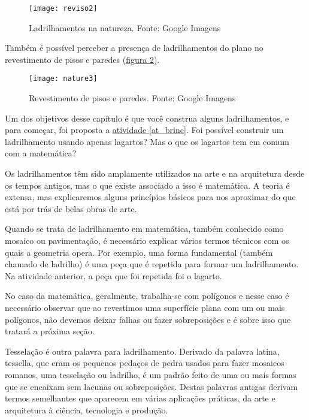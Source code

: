 \begin{figure}[H]
\centering
\texttt{[image: reviso2]}
\caption{Ladrilhamentos na natureza. Fonte: Google Imagens}
\label{natureza}
\end{figure}

Também é possível perceber a presença de ladrilhamentos do plano no revestimento de pisos e paredes (\hyperref[natureza1]{figura \ref{natureza1}}). 


\begin{figure}[H]
\centering
\texttt{[image: nature3]}
\caption{Revestimento de pisos e paredes. Fonte: Google Imagens}
\label{natureza1}
\end{figure}

Um dos objetivos desse capítulo é que você construa alguns ladrilhamentos, e para começar, foi proposta a \hyperref[at_brinc]{atividade \ref{at_brinc}}. Foi possível construir um ladrilhamento usando apenas lagartos?  Mas o que os lagartos tem em comum com a matemática? 

Os ladrilhamentos têm sido amplamente utilizados na arte e na arquitetura desde os tempos antigos, mas o que existe associado a isso é  matemática. A teoria é extensa, mas explicaremos alguns princípios básicos para nos aproximar do que está por trás de belas obras de arte. 

Quando se trata de ladrilhamento em matemática, também conhecido como mosaico ou pavimentação, é necessário explicar vários termos técnicos com os quais a geometria opera. Por exemplo, uma forma fundamental (também chamado de ladrilho) é uma peça que é repetida para formar um ladrilhamento. Na atividade anterior, a peça que foi repetida foi o lagarto.


No caso da matemática, geralmente, trabalha-se com polígonos e nesse caso é necessário observar que ao revestimos uma superfície plana com um ou mais polígonos, não devemos  deixar falhas ou fazer sobreposições e é sobre isso que tratará a próxima seção.


 \label{tess}

Tesselação é outra palavra para ladrilhamento. Derivado da palavra latina, tessella, que eram os pequenos pedaços de pedra usados para fazer mosaicos romanos, uma tesselação ou ladrilho, é um padrão feito de uma ou mais formas que se encaixam sem lacunas ou sobreposições.
Destas palavras antigas derivam termos semelhantes que aparecem em várias aplicações práticas, da arte e arquitetura à ciência, tecnologia e produção.

